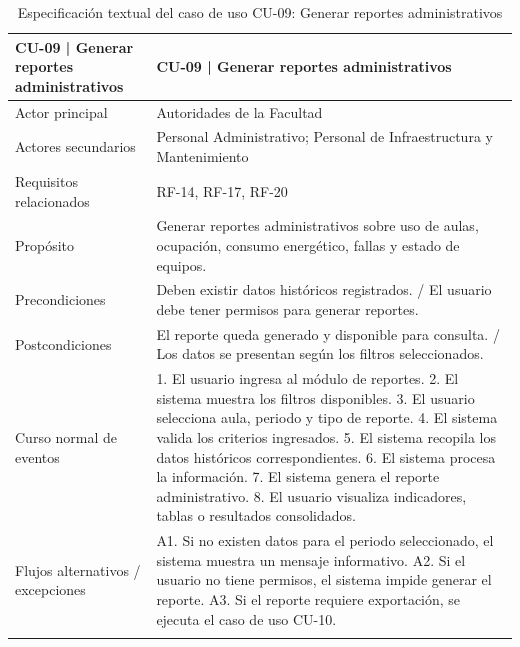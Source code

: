 \begingroup
\small
\begin{longtable}{|p{7.8cm}|p{7.8cm}|}
\hline
CU-09 | Generar reportes administrativos & CU-09 | Generar reportes administrativos \\ \hline
Actor principal & Autoridades de la Facultad \\ \hline
Actores secundarios & Personal Administrativo; Personal de Infraestructura y Mantenimiento \\ \hline
Requisitos relacionados & RF-14, RF-17, RF-20 \\ \hline
Propósito & Generar reportes administrativos sobre uso de aulas, ocupación, consumo energético, fallas y estado de equipos. \\ \hline
Precondiciones & Deben existir datos históricos registrados. / El usuario debe tener permisos para generar reportes. \\ \hline
Postcondiciones & El reporte queda generado y disponible para consulta. / Los datos se presentan según los filtros seleccionados. \\ \hline
Curso normal de eventos & 1. El usuario ingresa al módulo de reportes. 2. El sistema muestra los filtros disponibles. 3. El usuario selecciona aula, periodo y tipo de reporte. 4. El sistema valida los criterios ingresados. 5. El sistema recopila los datos históricos correspondientes. 6. El sistema procesa la información. 7. El sistema genera el reporte administrativo. 8. El usuario visualiza indicadores, tablas o resultados consolidados. \\ \hline
Flujos alternativos / excepciones & A1. Si no existen datos para el periodo seleccionado, el sistema muestra un mensaje informativo. A2. Si el usuario no tiene permisos, el sistema impide generar el reporte. A3. Si el reporte requiere exportación, se ejecuta el caso de uso CU-10. \\ \hline
\caption{Especificación textual del caso de uso CU-09: Generar reportes administrativos}
\end{longtable}
\endgroup

